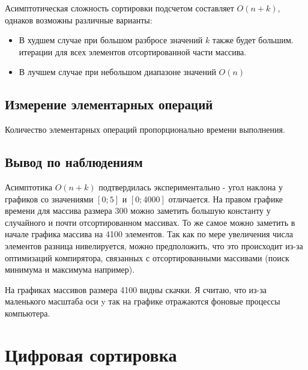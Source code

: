 \documentclass[11pt]{article}
\begin{document}
Асимптотическая сложность сортировки подсчетом составляет $O(n + k)$, однаков возможны различные варианты:
\begin{itemize}
    \item В худшем случае при большом разбросе значений $k$ также будет большим.
          итерации для всех элементов отсортированной части массива.
    \item В лучшем случае при небольшом диапазоне значений $O(n)$
\end{itemize}

\subsection{Измерение элементарных операций}

\begin{center}
\end{center}
{ \hspace*{\fill} }

\begin{center}
\end{center}
{ \hspace*{\fill} }

Количество элементарных операций пропорционально времени выполнения.

\subsection{Вывод по наблюдениям}

Асимптотика $O(n + k)$ подтвердилась экспериментально - угол наклона у графиков со значениями
$\left[0;5\right]$ и $\left[0;4000\right]$ отличается. На правом графике времени для массива размера 300
можно заметить большую константу у случайного и почти отсортированном массивах. То же самое можно заметить в
начале графика массива на 4100 элементов. Так как по мере увеличения числа элементов разница нивелируется, можно предположить, что
это происходит из-за оптимизаций компирятора, связанных с отсортированными массивами (поиск минимума и максимума например).

На графиках массивов размера 4100 видны скачки. Я считаю, что из-за маленького масштаба оси y так на графике отражаются фоновые процессы
компьютера.

\newpage

\setcounter{section}{8}
\section*{\centering Цифровая сортировка}
\end{document}
